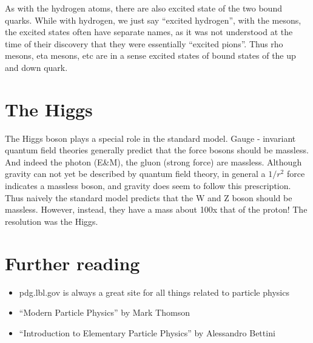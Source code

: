 As with the hydrogen atoms, there are also excited state of the two bound quarks.  While with hydrogen, we just say “excited hydrogen”, with the mesons, the excited states often have separate names, as it was not understood at the time of their discovery that they were essentially “excited pions”.  Thus rho mesons, eta mesons, etc are in a sense excited states of bound states of the up and down quark.

\section{The Higgs}
The  Higgs  boson  plays  a  special  role  in  the  standard  model.    Gauge
-
invariant  quantum  field  theories 
generally 
predict  that  the  force  bosons  should  be  massless.    And  indeed  the  photon  (E\&M),  the  gluon 
(strong force) are massless.  Although gravity can not yet be described by quantum field theory, in general a 
$1/r^2$ force indicates a massless boson, and gravity does
seem to follow this prescription.   Thus naively the 
standard model predicts that the W and Z boson should be massless.  However, instead, they have a mass 
about 100x that of the proton!  
The resolution was the Higgs.


\section{Further reading}
\begin{itemize}
\item pdg.lbl.gov is always a great site for all things related to particle physics
\item “Modern Particle Physics” by Mark Thomson
\item “Introduction to Elementary Particle Physics” by Alessandro Bettini
\end{itemize}


